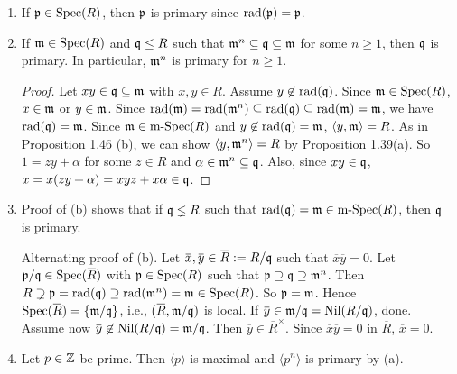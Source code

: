 \begin{example}
    \begin{enumerate}
        \item 
            If $\mathfrak{p} \in \operatorname{Spec}(R)$, then $\mathfrak{p}$ is primary since $\operatorname{rad}(\mathfrak{p}) = \mathfrak{p}$.
        \item 
            If $\mathfrak{m} \in \operatorname{Spec}(R)$ and $\mathfrak{q} \leq R$ such that $\mathfrak{m}^{n} \subseteq \mathfrak{q} \subseteq \mathfrak{m}$ for some $n \geq 1$, then $\mathfrak{q}$ is primary. In particular, $\mathfrak{m}^{n}$ is primary for $n \geq 1$.
            \begin{proof}
                Let $xy \in \mathfrak{q} \subseteq \mathfrak{m}$ with $x,y \in R$. Assume $y \not\in \operatorname{rad}(\mathfrak{q})$. Since $\mathfrak{m} \in \operatorname{Spec}(R)$, $x \in \mathfrak{m}$ or $y \in \mathfrak{m}$. Since $\operatorname{rad}(\mathfrak{m}) = \operatorname{rad}(\mathfrak{m}^{n}) \subseteq \operatorname{rad}(\mathfrak{q}) \subseteq \operatorname{rad}(\mathfrak{m}) = \mathfrak{m}$, we have $\operatorname{rad}(\mathfrak{q}) = \mathfrak{m}$. Since $\mathfrak{m} \in \operatorname{m-Spec}(R)$ and $y \not \in \operatorname{rad}(\mathfrak{q}) = \mathfrak{m}$, $\langle y,\mathfrak{m} \rangle = R$. As in Proposition 1.46 (b), we can show $\langle y,\mathfrak{m}^{n} \rangle = R$ by Proposition 1.39(a). So $1 = zy + \alpha$ for some $z \in R$ and $\alpha \in \mathfrak{m}^{n} \subseteq \mathfrak{q}$. Also, since $xy \in \mathfrak{q}$, $x = x(zy+\alpha) = xyz+x\alpha \in \mathfrak{q}$. 
            \end{proof}
        \item 
            Proof of (b) shows that if $\mathfrak{q} \lneq R$ such that $\operatorname{rad}(\mathfrak{q}) = \mathfrak{m} \in \operatorname{m-Spec}(R)$, then $\mathfrak{q}$ is primary. \par 
            Alternating proof of (b). Let $\overbar{x},\overbar{y} \in \overbar{R}: = R/\ffq$ such that $\overbar{x} \overbar{y} = 0$. Let $\ffp/\ffq \in \operatorname{Spec}(\overbar{R})$ with $\mathfrak{p} \in \operatorname{Spec}(R)$ such that $\mathfrak{p} \supseteq \mathfrak{q} \supseteq \mathfrak{m}^{n}$. Then $R \supsetneq \mathfrak{p} = \operatorname{rad}(\mathfrak{q}) \supseteq \operatorname{rad}(\mathfrak{m}^{n}) = \mathfrak{m} \in \operatorname{Spec}(R)$. So $\mathfrak{p} = \mathfrak{m}$. Hence $\operatorname{Spec}(\overbar{R}) = \{\ffm/\ffq\}$, i.e., $(\overbar{R},\ffm/\ffq)$ is local. If $\overbar{y} \in \ffm/\ffq = \operatorname{Nil}(R/\ffq)$, done. Assume now $\overbar{y} \not \in \operatorname{Nil}(R/\ffq) = \ffm/\ffq$. Then $\overbar{y} \in \overbar{R}^{\times}$. Since $\overbar{x} \overbar{y} = 0$ in $\overbar{R}$, $\overbar{x} = 0$.
        \item Let $p \in \mathbb{Z}$ be prime. Then $\langle p \rangle$ is maximal and $\langle p^{n} \rangle$ is primary by (a).
    \end{enumerate}
\end{example}

